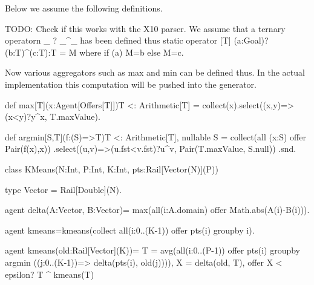 Below we assume the following definitions.

TODO: Check if this works with the X10 parser.
We assume that a ternary operatorn _ ? _^_ has been defined thus
  static operator [T] (a:Goal)?(b:T)^(c:T):T = M where if (a) M=b else M=c.

Now various aggregators such as max and min can be defined thus. In the actual
implementation this computation will be pushed into the generator.

   def max[T](x:Agent[Offers[T]]){T <: Arithmetic[T]} = 
      collect(x).select((x,y)=>(x<y)?y^x, T.maxValue).

   def argmin[S,T](f:(S)=>T){T <: Arithmetic[T], nullable S} = 
      collect(all (x:S) offer Pair(f(x),x))
         .select((u,v)=>(u.fst<v.fst)?u^v, Pair(T.maxValue, S.null))
         .snd.

class KMeans(N:Int, P:Int, K:Int, pts:Rail[Vector(N)](P)) {
  type Vector = Rail[Double](N). 

  agent delta(A:Vector, B:Vector)= max(all(i:A.domain) offer Math.abs(A(i)-B(i))).

  agent kmeans=kmeans(collect all(i:0..(K-1)) offer pts(i) groupby i).

  agent kmeans(old:Rail[Vector](K))= {
    T = avg(all(i:0..(P-1))
           offer pts(i) groupby 
             argmin ((j:0..(K-1))=> delta(pts(i), old(j)))),
     X = delta(old, T),
     offer X < epsilon? T ^ kmeans(T)
   }
}






